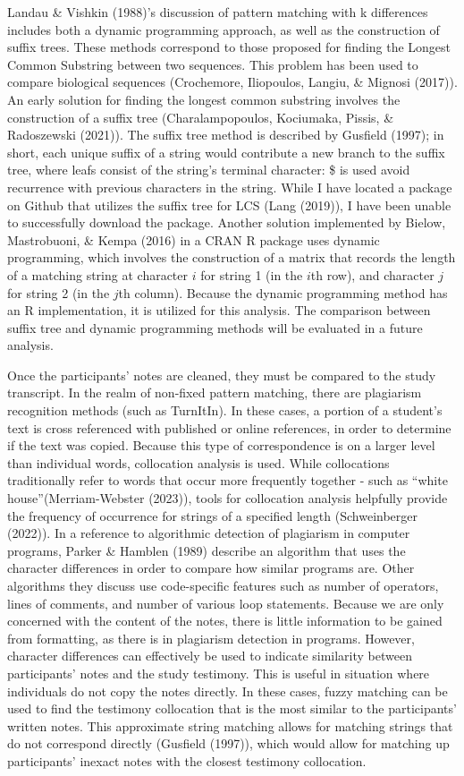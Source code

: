 \documentclass[print]{nuthesis}
\begin{document}
Landau \& Vishkin (1988)'s discussion of pattern matching with k differences includes both a dynamic programming approach, as well as the construction of suffix trees.
These methods correspond to those proposed for finding the Longest Common Substring between two sequences.
This problem has been used to compare biological sequences (Crochemore, Iliopoulos, Langiu, \& Mignosi (2017)).
An early solution for finding the longest common substring involves the construction of a suffix tree (Charalampopoulos, Kociumaka, Pissis, \& Radoszewski (2021)).
The suffix tree method is described by Gusfield (1997); in short, each unique suffix of a string would contribute a new branch to the suffix tree, where leafs consist of the string's terminal character: \$ is used avoid recurrence with previous characters in the string.
While I have located a package on Github that utilizes the suffix tree for LCS (Lang (2019)), I have been unable to successfully download the package.
Another solution implemented by Bielow, Mastrobuoni, \& Kempa (2016) in a CRAN R package uses dynamic programming, which involves the construction of a matrix that records the length of a matching string at character \(i\) for string 1 (in the \(i\)th row), and character \(j\) for string 2 (in the \(j\)th column).
Because the dynamic programming method has an R implementation, it is utilized for this analysis.
The comparison between suffix tree and dynamic programming methods will be evaluated in a future analysis.

Once the participants' notes are cleaned, they must be compared to the study transcript.
In the realm of non-fixed pattern matching, there are plagiarism recognition methods (such as TurnItIn).
In these cases, a portion of a student's text is cross referenced with published or online references, in order to determine if the text was copied.
Because this type of correspondence is on a larger level than individual words, collocation analysis is used.
While collocations traditionally refer to words that occur more frequently together - such as ``white house''(Merriam-Webster (2023)), tools for collocation analysis helpfully provide the frequency of occurrence for strings of a specified length (Schweinberger (2022)).
In a reference to algorithmic detection of plagiarism in computer programs, Parker \& Hamblen (1989) describe an algorithm that uses the character differences in order to compare how similar programs are.
Other algorithms they discuss use code-specific features such as number of operators, lines of comments, and number of various loop statements.
Because we are only concerned with the content of the notes, there is little information to be gained from formatting, as there is in plagiarism detection in programs.
However, character differences can effectively be used to indicate similarity between participants' notes and the study testimony.
This is useful in situation where individuals do not copy the notes directly.
In these cases, fuzzy matching can be used to find the testimony collocation that is the most similar to the participants' written notes.
This approximate string matching allows for matching strings that do not correspond directly (Gusfield (1997)), which would allow for matching up participants' inexact notes with the closest testimony collocation.
\end{document}
